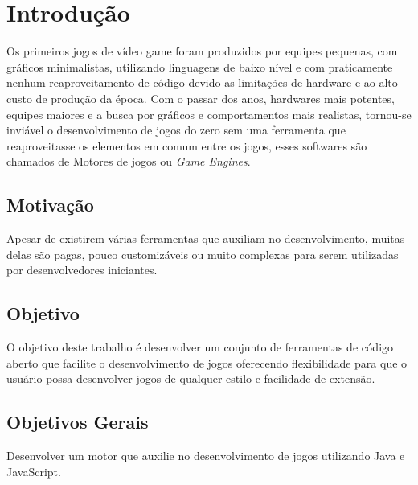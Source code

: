 \documentclass[12pt,	openright, twoside,	a4paper, english, french, spanish, brazil]{abntex2}
\begin{document}
\chapter[Introdução]{Introdução}
Os primeiros jogos de vídeo game foram produzidos por equipes pequenas, com gráficos minimalistas, utilizando linguagens de baixo nível e com praticamente nenhum reaproveitamento de código devido as limitações de hardware e ao alto custo de produção da época. Com o passar dos anos, hardwares mais potentes, equipes maiores e a busca por gráficos e comportamentos mais realistas, tornou-se inviável o desenvolvimento de jogos do zero sem uma ferramenta que reaproveitasse os elementos em comum entre os jogos, esses softwares são chamados de Motores de jogos ou \textit{Game Engines}. 

%
%

\section{Motivação}
Apesar de existirem várias ferramentas que auxiliam no desenvolvimento, muitas delas são pagas, pouco customizáveis ou muito complexas para serem utilizadas por desenvolvedores iniciantes.

%
%

\section{Objetivo}
O objetivo deste trabalho é desenvolver um conjunto de ferramentas de código aberto que facilite o desenvolvimento de jogos oferecendo flexibilidade para que o usuário possa desenvolver jogos de qualquer estilo e facilidade de extensão.

%
%

\section{Objetivos Gerais}
Desenvolver um motor que auxilie no desenvolvimento de jogos utilizando Java e JavaScript.

%
%
\end{document}
